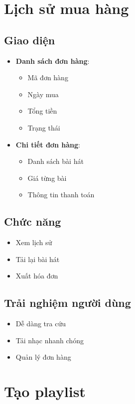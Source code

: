 \documentclass{article}
\begin{document}
\section{Lịch sử mua hàng}
\subsection{Giao diện}
\begin{itemize}
    \item \textbf{Danh sách đơn hàng}:
    \begin{itemize}
        \item Mã đơn hàng
        \item Ngày mua
        \item Tổng tiền
        \item Trạng thái
    \end{itemize}
    \item \textbf{Chi tiết đơn hàng}:
    \begin{itemize}
        \item Danh sách bài hát
        \item Giá từng bài
        \item Thông tin thanh toán
    \end{itemize}
\end{itemize}

\subsection{Chức năng}
\begin{itemize}
    \item Xem lịch sử
    \item Tải lại bài hát
    \item Xuất hóa đơn
\end{itemize}

\subsection{Trải nghiệm người dùng}
\begin{itemize}
    \item Dễ dàng tra cứu
    \item Tải nhạc nhanh chóng
    \item Quản lý đơn hàng
\end{itemize}

\section{Tạo playlist}
\end{document}
